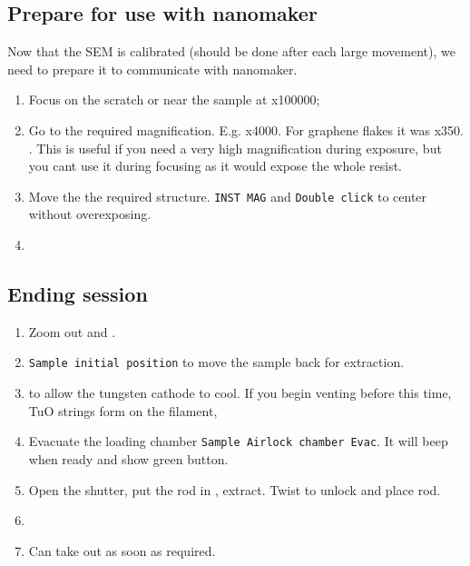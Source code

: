  \subsection{Prepare for use with nanomaker}
  Now that  the SEM  is calibrated  (should be  done after  each large
  movement), we need to prepare it to communicate with nanomaker.

  \begin{enumerate}
  \item Focus on the scratch or near the sample at x100000;
  \item Go  to the  required magnification.  E.g. x4000.  For graphene
    flakes  it was  x350.  . This is useful  if you need a very high
    magnification during exposure, but you cant use it during focusing
    as it would expose the whole resist.
  \item  Move  the  the  required  structure.  \texttt{INST  MAG}  and
        \texttt{Double   click}    to   center    without
    overexposing.
  \item   {}
  \end{enumerate}

  \subsection{Ending session}
  \begin{enumerate}
  \item Zoom  out and  .
  \item \texttt{Sample \ira initial position}  to move the sample back
    for extraction.
  \item {} to allow the tungsten cathode to cool. If
    you  begin venting  before  this  time, TuO  strings  form on  the
    filament,
  \item  Evacuate  the  loading chamber  \texttt{Sample  \ira  Airlock
      chamber  \ira Evac}.  It will  beep  when ready  and show  green
    button.
  \item  Open the  shutter, put  the rod  in ,
    extract. Twist to unlock and place rod.
  \item {}
  \item Can take out as soon as required.
  \end{enumerate}


